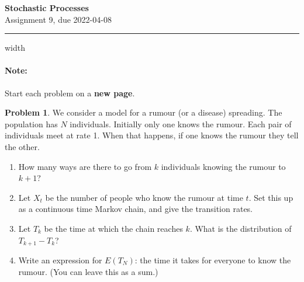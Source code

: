 \documentclass{article}
\theoremstyle{definition}
\newtheorem{problem}{Problem}
\begin{document}
\thispagestyle{crfooter}

\begin{center}
  {\LARGE \textbf{Stochastic Processes}} \\ \medskip
  {\Large Assignment 9, due 2022-04-08}
\end{center}

\hrule width \textwidth

\paragraph{Note:} Start each problem on a \textbf{new page}.%


\begin{problem}
  We consider a model for a rumour (or a disease) spreading.
  The population has $N$ individuals.
  Initially only one knows the rumour.
  Each pair of individuals meet at rate 1. When that happens, if one knows the rumour they tell the other.
  \begin{enumerate}
  \item How many ways are there to go from $k$ individuals knowing the rumour to $k+1$?
  \item Let $X_t$ be the number of people who know the rumour at time $t$.
    Set this up as a continuous time Markov chain, and give the transition rates.
  \item Let $T_k$ be the time at which the chain reaches $k$. What is the distribution of $T_{k+1}-T_k$?
  \item Write an expression for $E(T_N)$: the time it takes for everyone to know the rumour.
    (You can leave this as a sum.)
  \end{enumerate}
\end{problem}

\end{document}
